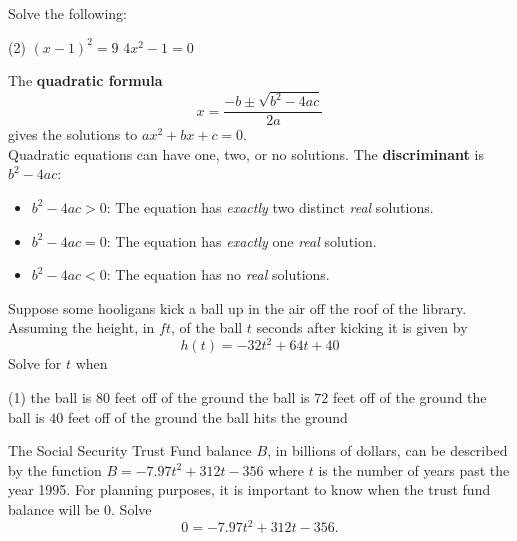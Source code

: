 \documentclass[../mathNotesPreamble]{subfiles}
\begin{document}
    \begin{center}
    \end{center}

    \begin{ex*}
      Solve the following:
    \end{ex*}
    \begin{extasks}[after-item-skip=\stretch{1}](2)
      \task $(x-1)^2=9$
      \task $4x^2-1=0$
    \end{extasks}

    \begin{defn*}
      The \textbf{quadratic formula}
        \[x=\dfrac{-b\pm\sqrt{b^2-4ac}}{2a}\]
      gives the solutions to $ax^2+bx+c=0$.\\[\baselineskip]
      Quadratic equations can have one, two, or no solutions. The \textbf{discriminant} is $b^2-4ac$:
      \begin{itemize}
        \item $b^2-4ac>0$: The equation has \emph{exactly} two distinct \emph{real} solutions.
        \item $b^2-4ac=0$: The equation has \emph{exactly} one \emph{real} solution.
        \item $b^2-4ac<0$: The equation has no \emph{real} solutions.
      \end{itemize}
    \end{defn*}
    \pagebreak

    \begin{ex*}
      Suppose some hooligans kick a ball up in the air off the roof of the library. Assuming the height, in $ft$, of the ball $t$ seconds after kicking it is given by
        \[h(t)=-32t^2+64t+40\]
      Solve for $t$ when
    \end{ex*}
    \begin{extasks}[after-item-skip=\stretch{1}](1)
      \task the ball is $80$ feet off of the ground
      \task the ball is $72$ feet off of the ground
      \task the ball is $40$ feet off of the ground
      \task the ball hits the ground
    \end{extasks}
    \pagebreak

    \begin{ex*}
      The Social Security Trust Fund balance $B$, in billions of dollars, can be described by the function
        $B=-7.97t^2+312t-356$
      where $t$ is the number of years past the year 1995. For planning purposes, it is important to know when the trust fund balance will be $0$. Solve
        \[0=-7.97t^2+312t-356.\]
    \end{ex*}

  \pagebreak
\end{document}
